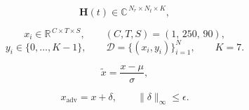 \begin{equation}\label{eq:csi-tensor}
  \mathbf{H}(t) \in \mathbb{C}^{\,N_r \times N_t \times K},
\end{equation}

\begin{equation}\label{eq:processed-window}
  x_i \in \mathbb{R}^{\,C \times T \times S}, \qquad (C,T,S)=(1,\,250,\,90),
\end{equation}
\begin{equation}\label{eq:dataset}
  y_i \in \{0,\dots,K-1\},\qquad
  \mathcal{D}=\{(x_i,y_i)\}_{i=1}^{N},\qquad K=7 .
\end{equation}

\begin{equation}\label{eq:normalization}
  \tilde{x} = \frac{x-\mu}{\sigma},
\end{equation}

\begin{equation}\label{eq:perturb-domain}
  x_{\mathrm{adv}} = x + \delta, \qquad \lVert\delta\rVert_{\infty}\le\epsilon .
\end{equation}



